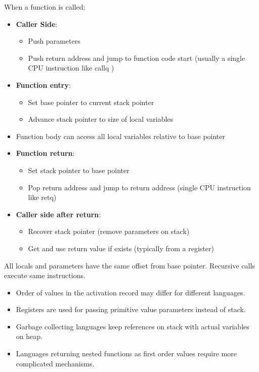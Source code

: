 When a function is called:
\begin{itemize}
  \item \textbf{Caller Side}:
    \begin{itemize}
      \item Push parameters
      \item Push return address and jump to function code start (usually a single CPU instruction like callq )
    \end{itemize}
  
    \item \textbf{Function entry}:
      \begin{itemize}
        \item Set base pointer to current stack pointer
        \item Advance stack pointer to size of local variables
      \end{itemize}
    
    \item Function body can access all local variables relative to base pointer
    
    \item \textbf{Function return}:
      \begin{itemize}
        \item Set stack pointer to base pointer
        \item Pop return address and jump to return address (single CPU instruction like retq)
      \end{itemize}
    
    \item \textbf{Caller side after return}:
      \begin{itemize}
        \item Recover stack pointer (remove parameters on stack)
        \item Get and use return value if exists (typically from a register)
      \end{itemize}
\end{itemize}

All locals and parameters have the same offset from base pointer. Recursive calls execute same instructions.

\begin{itemize}
  \item Order of values in the activation record may differ for different
  languages.
  \item Registers are used for passing primitive value parameters instead of stack.
  \item Garbage collecting languages keep references on stack with actual variables on heap.
  \item Languages returning nested functions as first order values require more complicated mechanisms.
\end{itemize}

